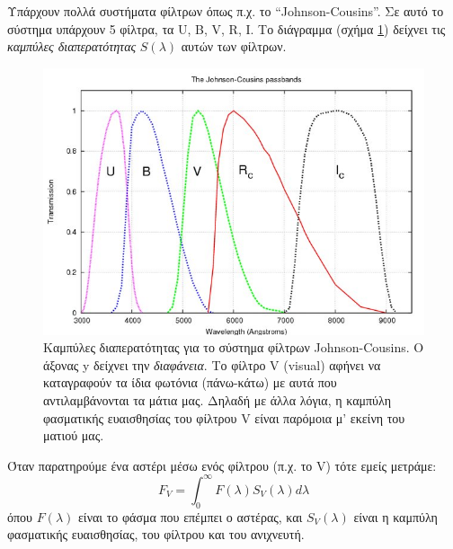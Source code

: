 Υπάρχουν πολλά συστήματα φίλτρων όπως π.χ. το ``Johnson-Cousins''. Σε αυτό το σύστημα υπάρχουν 5 φίλτρα, τα U, B, V, R, I. Το διάγραμμα (σχήμα \ref{fig:filter_curves}) δείχνει τις \textit{καμπύλες διαπερατότητας} $S(\lambda)$ αυτών των φίλτρων.

\begin{figure}
    \centering
    \includegraphics[scale=0.4]{Figures/filter_curves.jpg}
    \caption{Καμπύλες διαπερατότητας για το σύστημα φίλτρων Johnson-Cousins. Ο άξονας y δείχνει την \textit{διαφάνεια}. Το φίλτρο V (visual) αφήνει να καταγραφούν τα ίδια φωτόνια (πάνω-κάτω) με αυτά που αντιλαμβάνονται τα μάτια μας. Δηλαδή με άλλα λόγια, η καμπύλη φασματικής ευαισθησίας του φίλτρου V είναι παρόμοια μ' εκείνη του ματιού μας.}
    \label{fig:filter_curves}
\end{figure}

Όταν παρατηρούμε ένα αστέρι μέσω ενός φίλτρου (π.χ. το V) τότε εμείς μετράμε:
\begin{equation}
    F_V = \int_0^{\infty} F(\lambda) S_V(\lambda) d\lambda
\end{equation}
όπου $F(\lambda)$ είναι το φάσμα που επέμπει ο αστέρας, και $S_V(\lambda)$ είναι η καμπύλη φασματικής ευαισθησίας, του φίλτρου και του ανιχνευτή.

